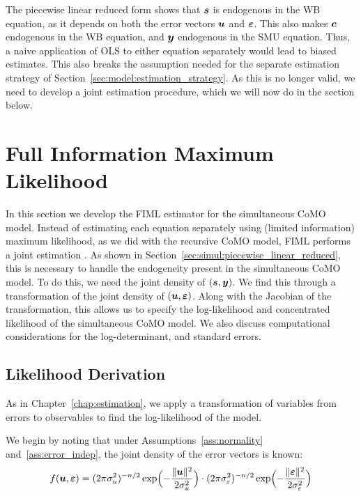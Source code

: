 The piecewise linear reduced form shows that $\bm{s}$ is endogenous in the WB equation, as it depends on both the error vectors $\bm{u}$ and $\bm{\varepsilon}$. This also makes $\bm{c}$ endogenous in the WB equation, and $\bm{y}$ endogenous in the SMU equation. Thus, a naive application of OLS to either equation separately would lead to biased estimates. This also breaks the assumption needed for the separate estimation strategy of Section~\ref{sec:model:estimation_strategy}. As this is no longer valid, we need to develop a joint estimation procedure, which we will now do in the section below.

\section{Full Information Maximum Likelihood}
\label{sec:simul:likelihood}
In this section we develop the FIML estimator for the simultaneous CoMO model. Instead of estimating each equation separately using (limited information) maximum likelihood, as we did with the recursive CoMO model, FIML performs a joint estimation \parencite[see][Sec.~3.1.3, for joint ML estimation in spatial models with multiple weight matrices]{LeSage2009}. As shown in Section~\ref{sec:simul:piecewise_linear_reduced}, this is necessary to handle the endogeneity present in the simultaneous CoMO model. To do this, we need the joint density of $(\bm{s}, \bm{y})$. We find this through a transformation of the joint density of $(\bm{u}, \bm{\varepsilon})$. Along with the Jacobian of the transformation, this allows us to specify the log-likelihood and concentrated likelihood of the simultaneous CoMO model. We also discuss computational considerations for the log-determinant, and standard errors.

\subsection{Likelihood Derivation}
\label{sec:simul:jacobian}
As in Chapter~\ref{chap:estimation}, we apply a transformation of variables from errors to observables to find the log-likelihood of the model.

We begin by noting that under Assumptions~\ref{ass:normality} and~\ref{ass:error_indep}, the joint density of the error vectors is known:
\begin{equation}
    f(\bm{u}, \bm{\varepsilon}) = (2\pi\sigma_u^2)^{-n/2}\exp\Bigl(-\frac{\|\bm{u}\|^2}{2\sigma_u^2}\Bigr)
    \cdot (2\pi\sigma_\varepsilon^2)^{-n/2}\exp\Bigl(-\frac{\|\bm{\varepsilon}\|^2}{2\sigma_\varepsilon^2}\Bigr)
\end{equation}

